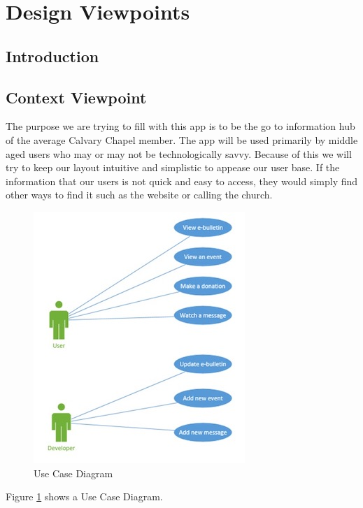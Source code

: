 \documentclass[letterpaper,10pt,draftclsnofoot,onecolumn,titlepage]{IEEEtran}
\begin{document}
	\section{Design Viewpoints}
	
		\subsection{Introduction}
		
		\subsection{Context Viewpoint}
		The purpose we are trying to fill with this app is to be the go to information hub of the average Calvary Chapel member. 
		The app will be used primarily by middle aged users who may or may not be technologically savvy. 
		Because of this we will try to keep our layout intuitive and simplistic to appease our user base. 
		If the information that our users is not quick and easy to access, they would simply find other ways to find it such as the website or calling the church.
		
		\begin{figure}[H]
			\centering
			\includegraphics{UseCase.jpg}
			\caption{Use Case Diagram}
			\label{fig:usecase1}
		\end{figure}
		
		Figure \ref{fig:usecase1} shows a Use Case Diagram.
	
		
\end{document}

